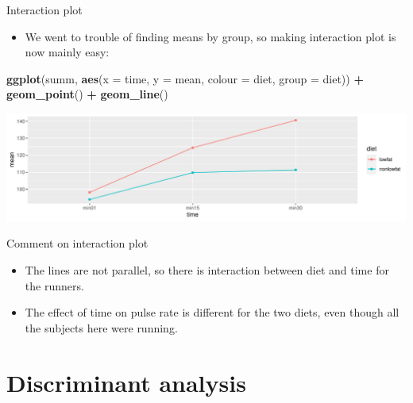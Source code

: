\documentclass[
  ignorenonframetext,
]{beamer}
\newenvironment{Shaded}{\begin{snugshade}}{\end{snugshade}}
\newcommand{\DataTypeTok}[1]{\textcolor[rgb]{0.13,0.29,0.53}{#1}}
\newcommand{\KeywordTok}[1]{\textcolor[rgb]{0.13,0.29,0.53}{\textbf{#1}}}
\newcommand{\NormalTok}[1]{#1}
\newcommand{\OperatorTok}[1]{\textcolor[rgb]{0.81,0.36,0.00}{\textbf{#1}}}
\newcommand{\StringTok}[1]{\textcolor[rgb]{0.31,0.60,0.02}{#1}}
\providecommand{\tightlist}{%
  \setlength{\itemsep}{0pt}\setlength{\parskip}{0pt}}
\begin{document}
\begin{frame}[fragile]{Interaction plot}
\protect\hypertarget{interaction-plot-4}{}

\begin{itemize}
\tightlist
\item
  We went to trouble of finding means by group, so making interaction
  plot is now mainly easy:
\end{itemize}

\begin{Shaded}
\begin{Highlighting}[]
\KeywordTok{ggplot}\NormalTok{(summ, }\KeywordTok{aes}\NormalTok{(}\DataTypeTok{x =}\NormalTok{ time, }\DataTypeTok{y =}\NormalTok{ mean, }\DataTypeTok{colour =}\NormalTok{ diet,}
                 \DataTypeTok{group =}\NormalTok{ diet)) }\OperatorTok{+}\StringTok{ }\KeywordTok{geom_point}\NormalTok{() }\OperatorTok{+}\StringTok{ }\KeywordTok{geom_line}\NormalTok{()}
\end{Highlighting}
\end{Shaded}

\includegraphics{slides_d29_files/figure-beamer/unnamed-chunk-297-1.pdf}

\end{frame}

\begin{frame}{Comment on interaction plot}
\protect\hypertarget{comment-on-interaction-plot}{}

\begin{itemize}
\tightlist
\item
  The lines are not parallel, so there is interaction between diet and
  time for the runners.
\item
  The effect of time on pulse rate is different for the two diets, even
  though all the subjects here were running.
\end{itemize}

\end{frame}

\hypertarget{discriminant-analysis}{%
\section{Discriminant analysis}\label{discriminant-analysis}}
\end{document}
